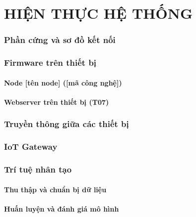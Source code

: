\chapter{HIỆN THỰC HỆ THỐNG}
\subsection{Phần cứng và sơ đồ kết nối}

\subsection{Firmware trên thiết bị}

\subsubsection{Node [tên node] ([mã công nghệ])}

\subsubsection{Webserver trên thiết bị (T07)}

\subsection{Truyền thông giữa các thiết bị}

\subsection{IoT Gateway}

\subsection{Trí tuệ nhân tạo}

\subsubsection{Thu thập và chuẩn bị dữ liệu}

\subsubsection{Huấn luyện và đánh giá mô hình}

